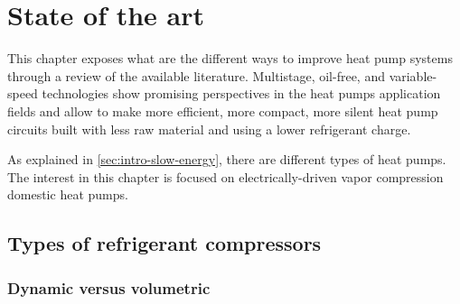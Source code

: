 \chapter{State of the art}
\label{chap:sota}
\resetallacronyms

\begin{shaded}
  This chapter exposes what are the different ways to improve heat
  pump systems through a review of the available
  literature. Multistage, oil-free, and variable-speed technologies
  show promising perspectives in the heat pumps application fields and
  allow to make more efficient, more compact, more silent heat pump
  circuits built with less raw material and using a lower refrigerant
  charge.
\end{shaded}

As explained in \cref{sec:intro-slow-energy}, there are different
types of heat pumps. The interest in this chapter is focused on
electrically-driven vapor compression domestic heat pumps.

\section{Types of refrigerant compressors}

\subsection{Dynamic versus volumetric}
\label{sec:sota-dyn-vs-vol}

